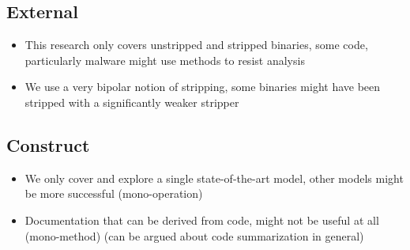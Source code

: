 \subsection{External} 
\begin{itemize}
    \item This research only covers unstripped and stripped binaries, some code, particularly malware might use methods to resist analysis
    \item We use a very bipolar notion of stripping, some binaries might have been stripped with a significantly weaker stripper
    
\end{itemize}
\subsection{Construct}
\begin{itemize}
    \item We only cover and explore a single state-of-the-art model, other models might be more successful (mono-operation)
    \item Documentation that can be derived from code, might not be useful at all (mono-method) (can be argued about code summarization in general)
\end{itemize}

